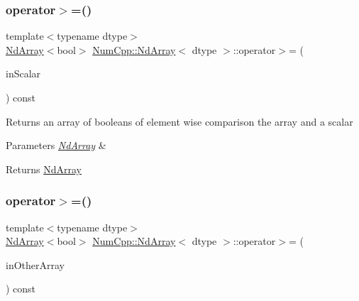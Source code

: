 \subsubsection{\texorpdfstring{operator$>$=()}{operator>=()}\hspace{0.1cm}{\footnotesize\ttfamily [1/2]}}
{\footnotesize\ttfamily template$<$typename dtype$>$ \\
\mbox{\hyperlink{class_num_cpp_1_1_nd_array}{Nd\+Array}}$<$bool$>$ \mbox{\hyperlink{class_num_cpp_1_1_nd_array}{Num\+Cpp\+::\+Nd\+Array}}$<$ dtype $>$\+::operator$>$= (\begin{DoxyParamCaption}\item[{dtype}]{in\+Scalar }\end{DoxyParamCaption}) const\hspace{0.3cm}{\ttfamily [inline]}}

Returns an array of booleans of element wise comparison the array and a scalar


\begin{DoxyParams}{Parameters}
{\em \mbox{\hyperlink{class_num_cpp_1_1_nd_array}{Nd\+Array}}} & \\
\hline
\end{DoxyParams}
\begin{DoxyReturn}{Returns}
\mbox{\hyperlink{class_num_cpp_1_1_nd_array}{Nd\+Array}} 
\end{DoxyReturn}
\mbox{\label{class_num_cpp_1_1_nd_array_ad2a6c6d2f55bf423a199d3184fc42b46}} 
\subsubsection{\texorpdfstring{operator$>$=()}{operator>=()}\hspace{0.1cm}{\footnotesize\ttfamily [2/2]}}
{\footnotesize\ttfamily template$<$typename dtype$>$ \\
\mbox{\hyperlink{class_num_cpp_1_1_nd_array}{Nd\+Array}}$<$bool$>$ \mbox{\hyperlink{class_num_cpp_1_1_nd_array}{Num\+Cpp\+::\+Nd\+Array}}$<$ dtype $>$\+::operator$>$= (\begin{DoxyParamCaption}\item[{const \mbox{\hyperlink{class_num_cpp_1_1_nd_array}{Nd\+Array}}$<$ dtype $>$ \&}]{in\+Other\+Array }\end{DoxyParamCaption}) const\hspace{0.3cm}{\ttfamily [inline]}}

